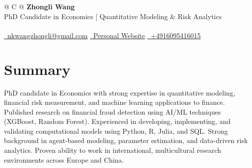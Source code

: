 \documentclass[a4paper,12pt]{article}
\begin{document}



\begin{tabularx}{\linewidth}{@{} C @{}}
\Huge{\textbf{Zhongli Wang}} \\[7.5pt]
PhD Candidate in Economics | Quantitative Modeling \& Risk Analytics \\
\\
\href{mailto:nkwangzhongli@gmail.com}{\raisebox{-0.05\height}\faEnvelope \ nkwangzhongli@gmail.com}\; %
\href{https://sites.google.com/view/zhongli-wang/}{\raisebox{-0.05\height}\faGlobe \ Personal Website}\; %
\href{tel:+4916095416015}{\raisebox{-0.05\height}\faMobile \ +4916095416015} \\


\end{tabularx}

\fancyfoot[R]{\small\textcolor{lightgray}{Updated: \today}}

\section{Summary}
PhD candidate in Economics with strong expertise in quantitative modeling, financial risk measurement, and machine learning applications to finance. Published research on financial fraud detection using AI/ML techniques (XGBoost, Random Forest). Experienced in developing, implementing, and validating computational models using Python, R, Julia, and SQL. Strong background in agent-based modeling, parameter estimation, and data-driven risk analytics. Proven ability to work in international, multicultural research environments across Europe and China.
\end{document}
